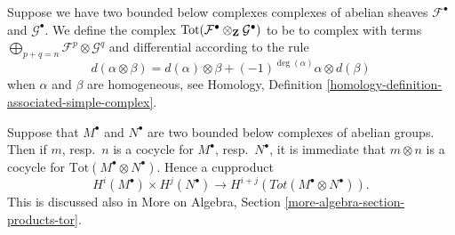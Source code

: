 \medskip\noindent
Suppose we have two bounded below complexes complexes of abelian sheaves
${\mathcal F}^\bullet$ and ${\mathcal G}^\bullet$. We define the complex
$\text{Tot}({\mathcal F}^\bullet\otimes_{\bf Z} {\mathcal G}^\bullet)$
to be to complex with terms
$\bigoplus_{p + q = n} {\mathcal F}^p \otimes {\mathcal G}^q$
and differential according to the rule
\begin{equation}
\label{equation-differential-tensor-product-complexes}
d(\alpha \otimes \beta) =
d(\alpha)\otimes \beta + (-1)^{\deg(\alpha)} \alpha \otimes d(\beta)
\end{equation}
when $\alpha$ and $\beta$ are homogeneous, see
Homology, Definition \ref{homology-definition-associated-simple-complex}.

\medskip\noindent
Suppose that $M^\bullet$ and $N^\bullet$ are two bounded below
complexes of abelian groups. Then if $m$, resp.\ $n$
is a cocycle for $M^\bullet$, resp.\ $N^\bullet$, it is immediate
that $m \otimes n$ is a cocycle for $\text{Tot}(M^\bullet\otimes N^\bullet)$.
Hence a cupproduct
$$
H^i(M^\bullet) \times H^j(N^\bullet)
\longrightarrow
H^{i + j}(Tot(M^\bullet\otimes N^\bullet)).
$$
This is discussed also in
More on Algebra, Section \ref{more-algebra-section-products-tor}.


